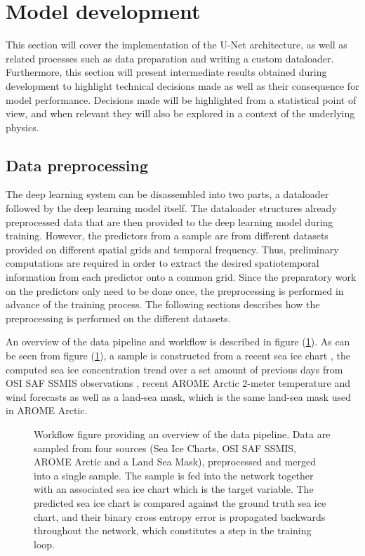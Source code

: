 \documentclass[../main/thesis]{subfiles}
\begin{document}
\section{Model development}
\label{sec:developing a unet}
This section will cover the implementation of the U-Net architecture, as well as related processes such as data preparation and writing a custom dataloader. Furthermore, this section will present intermediate results obtained during development to highlight technical decisions made as well as their consequence for model performance. Decisions made will be highlighted from a statistical point of view, and when relevant they will also be explored in a context of the underlying physics.

\subsection{Data preprocessing}
The deep learning system can be disassembled into two parts, a dataloader followed by the deep learning model itself. The dataloader structures already preprocessed data that are then provided to the deep learning model during training. However, the predictors from a sample are from different datasets provided on different spatial grids and temporal frequency. Thus, preliminary computations are required in order to extract the desired spatiotemporal information from each predictor onto a common grid. Since the preparatory work on the predictors only need to be done once, the preprocessing is performed in advance of the training process. The following sections describes how the preprocessing is performed on the different datasets.

An overview of the data pipeline and workflow is described in figure (\ref{fig:data_pipeline}). As can be seen from figure (\ref{fig:data_pipeline}), a sample is constructed from a recent sea ice chart \citep{Dinessen2020}, the computed sea ice concentration trend over a set amount of previous days from OSI SAF SSMIS observations \citep{Tonboe2017}, recent AROME Arctic \citep{Mueller2017} 2-meter temperature and wind forecasts as well as a land-sea mask, which is the same land-sea mask used in AROME Arctic. 

\begin{figure}
    \centering
    
    \caption{\label{fig:data_pipeline} Workflow figure providing an overview of the data pipeline. Data are sampled from four sources (Sea Ice Charts, OSI SAF SSMIS, AROME Arctic and a Land Sea Mask), preprocessed and merged into a single sample. The sample is fed into the network together with an associated sea ice chart which is the target variable. The predicted sea ice chart is compared against the ground truth sea ice chart, and their binary cross entropy error is propagated backwards throughout the network, which constitutes a step in the training loop.}
\end{figure}
\end{document}
